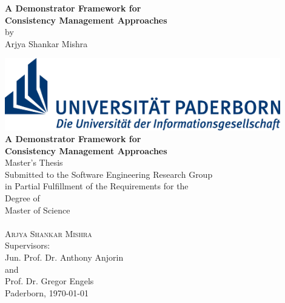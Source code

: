 \documentclass[%
				12pt,
				a4paper,
				oneside,
				titlepage,
				headsepline,
				numbers=noenddot,
				listof=totoc,
				index=totoc,
				bibliography=totoc]{scrartcl}
\theoremstyle{definition}
\begin{document}
    
	
	\setcounter{page}{1}
	{
		\thispagestyle{empty}
		\begin{center}
			{\vspace*{170pt}\Large\textbf{A Demonstrator Framework for\\[5pt] 
					Consistency Management Approaches}}\\[30pt]
			by\\[15pt]
			{\large Arjya Shankar Mishra}
		\end{center}
		\clearpage
		
		\thispagestyle{empty}          
		\begin{center}
				
		\end{center}
		\clearpage
	}  

	\begin{titlepage}
	\thispagestyle{empty}
	\begin{center}

			\includegraphics[width=12cm]{figures/Logo_Uni_Paderborn}\\
                      
      		\vspace{3cm}
			{\LARGE  \textbf{A Demonstrator Framework for\\ [7pt]
					Consistency Management Approaches}} \\ 
			\vspace{0,7cm}
			{\Large Master's Thesis }\\[6pt]
			Submitted to the Software Engineering Research Group\\
			in Partial Fulfillment of the Requirements for the\\
			Degree of\\[6pt]
			{\Large Master of Science}\\
			\vspace{30pt}
			 \\[4pt]
			{\scshape\large Arjya Shankar Mishra}\\	
			\vspace{60pt}
			Supervisors:\\[4pt]
			{\large Jun. Prof. Dr. Anthony Anjorin}\\
			and\\[2pt]
			{\large Prof. Dr. Gregor Engels}\\
			\vspace{60pt}
			{Paderborn, \today}
					
	\end{center}
	\end{titlepage}
	\clearpage
	
\end{document}
